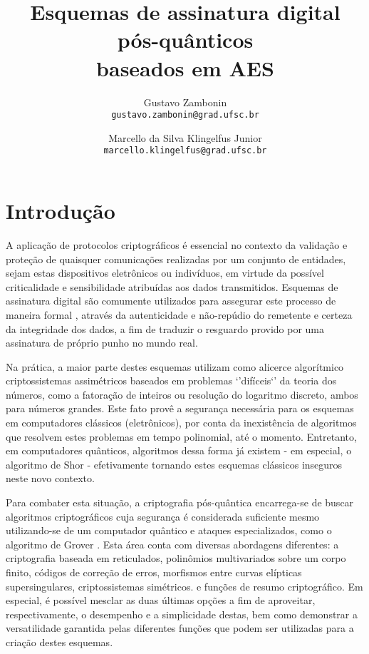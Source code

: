 \documentclass{article}
\title{Esquemas de assinatura digital pós-quânticos \\ baseados em AES}
\author{Gustavo Zambonin \\ \texttt{gustavo.zambonin@grad.ufsc.br} \and Marcello da Silva Klingelfus Junior \\ \texttt{marcello.klingelfus@grad.ufsc.br}}
\date{}
\begin{document}
\maketitle

\section{Introdução}

A aplicação de protocolos criptográficos é essencial no contexto da validação e
proteção de quaisquer comunicações realizadas por um conjunto de entidades,
sejam estas dispositivos eletrônicos ou indivíduos, em virtude da possível
criticalidade e sensibilidade atribuídas aos dados transmitidos. Esquemas de
assinatura digital são comumente utilizados para assegurar este processo de
maneira formal \cite{Goldreich:2004:FCV:975541}, através da autenticidade e
não-repúdio do remetente e certeza da integridade dos dados, a fim de
traduzir o resguardo provido por uma assinatura de próprio punho no mundo real.

Na prática, a maior parte destes esquemas utilizam como alicerce algorítmico
criptossistemas assimétricos baseados em problemas `'difíceis`' da teoria
dos números, como a fatoração de inteiros ou resolução do logaritmo discreto,
ambos para números grandes. Este fato provê a segurança necessária para os
esquemas em computadores clássicos (eletrônicos), por conta da inexistência de
algoritmos que resolvem estes problemas em tempo polinomial, até o momento.
Entretanto, em computadores quânticos, algoritmos dessa forma já existem - em
especial, o algoritmo de Shor \cite{Shor:1997:PAP:264393.264406} - efetivamente
tornando estes esquemas clássicos inseguros neste novo contexto.

Para combater esta situação, a criptografia pós-quântica encarrega-se de buscar
algoritmos criptográficos cuja segurança é considerada suficiente mesmo
utilizando-se de um computador quântico e ataques especializados, como o
algoritmo de Grover \cite{Grover:1996:FQM:237814.237866}. Esta área conta com
diversas abordagens diferentes: a criptografia baseada em reticulados,
polinômios multivariados sobre um corpo finito, códigos de correção de erros,
morfismos entre curvas elípticas supersingulares, criptossistemas simétricos.
e funções de resumo criptográfico. Em especial, é possível mesclar as duas
últimas opções a fim de aproveitar, respectivamente, o desempenho e a
simplicidade destas, bem como demonstrar a versatilidade garantida pelas
diferentes funções que podem ser utilizadas para a criação destes esquemas.
\end{document}
